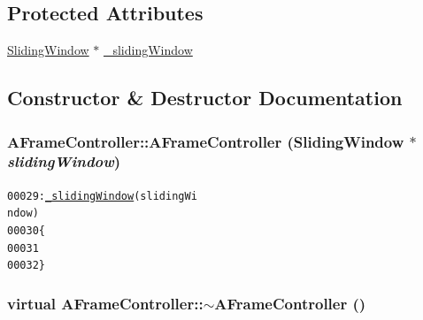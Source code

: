 \subsection*{Protected Attributes}
\begin{DoxyCompactItemize}
\item 
\hyperlink{class_sliding_window}{SlidingWindow} $\ast$ \hyperlink{class_a_frame_controller_aca7790494d5c5d114171269ddaabd568}{\_\-slidingWindow}
\end{DoxyCompactItemize}


\subsection{Constructor \& Destructor Documentation}
\hypertarget{class_a_frame_controller_a448319ad03f91eebc5da7fdf8a43516c}{
\subsubsection[{AFrameController}]{\setlength{\rightskip}{0pt plus 5cm}AFrameController::AFrameController ({\bf SlidingWindow} $\ast$ {\em slidingWindow})}}
\label{class_a_frame_controller_a448319ad03f91eebc5da7fdf8a43516c}




\begin{footnotesize}\begin{alltt}
00029                                                        : \hyperlink{class_a_frame_controller_aca7790494d5c5d114171269ddaabd568}{_slidingWindow}(slidingWi
      ndow)
00030         \{
00031 
00032         \}
\end{alltt}\end{footnotesize}


\hypertarget{class_a_frame_controller_a71b793347efaa6e35b494ae728739ad0}{
\subsubsection[{$\sim$AFrameController}]{\setlength{\rightskip}{0pt plus 5cm}virtual AFrameController::$\sim$AFrameController ()}}
\label{class_a_frame_controller_a71b793347efaa6e35b494ae728739ad0}




